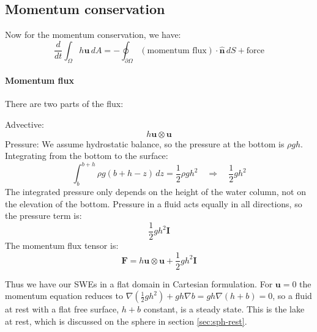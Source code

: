 \subsection{Momentum conservation}
Now for the momentum conservation, we have:
\begin{equation}\label{eq:flat-momentum}
    \frac{d}{dt}\int_\Omega h\mathbf{u}\,dA = -\oint_{\partial\Omega}(\text{momentum flux})\cdot\hat{\mathbf{n}}\,dS + \text{force}
\end{equation}

\paragraph{Momentum flux}
There are two parts of the flux:

Advective:
\begin{equation*}
    h\mathbf{u}\otimes\mathbf{u}
\end{equation*}
Pressure: We assume hydrostatic balance, so the pressure at the bottom is $\rho gh$. Integrating from the bottom to the surface:
\begin{equation*}
    \int_b^{b+h}\rho g(b + h - z)\,dz = \frac12\rho gh^2 \quad\Rightarrow\quad \frac12gh^2
\end{equation*}
The integrated pressure only depends on the height of the water column, not on the elevation of the bottom. Pressure in a fluid acts equally in all directions, so the pressure term is:
\begin{equation*}
    \frac12gh^2\mathbf{I}
\end{equation*}
The momentum flux tensor is:
\begin{equation}\label{eq:flat-flux}
    \mathbf{F} = h\mathbf{u}\otimes\mathbf{u} + \frac12gh^2\mathbf{I}
\end{equation}

Thus we have our SWEs in a flat domain in Cartesian formulation. For $\mathbf{u} = 0$ the momentum equation reduces to $\nabla(\frac12gh^2) + gh\nabla b = gh\nabla(h + b) = 0$, so a fluid at rest with a flat free surface, $h + b$ constant, is a steady state. This is the lake at rest, which is discussed on the sphere in section \ref{sec:sph-rest}.
